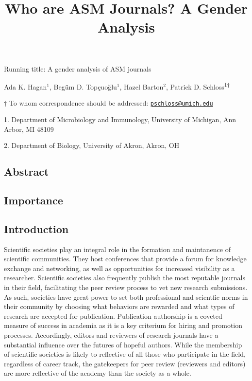 \documentclass[11pt,]{article}
\title{Who are ASM Journals? A Gender Analysis}
\author{}
\date{}
\begin{document}
\maketitle

\vspace{35mm}

Running title: A gender analysis of ASM journals

\vspace{35mm}

Ada K. Hagan\({^1}\), Begüm D. Topçuoğlu\({^1}\), Hazel Barton\({^2}\),
Patrick D. Schloss\textsuperscript{1\(\dagger\)}

\vspace{40mm}

\(\dagger\) To whom correspondence should be addressed:
\href{mailto:pschloss@umich.edu}{\nolinkurl{pschloss@umich.edu}}

1. Department of Microbiology and Immunology, University of Michigan,
Ann Arbor, MI 48109

2. Department of Biology, University of Akron, Akron, OH

\newpage

\linenumbers

\subsection{Abstract}\label{abstract}

\subsection{Importance}\label{importance}

\subsection{Introduction}\label{introduction}

Scientific societies play an integral role in the formation and
maintanence of scientific communities. They host conferences that
provide a forum for knowledge exchange and networking, as well as
opportunities for increased visibility as a researcher. Scientific
societies also frequently publish the most reputable journals in their
field, facilitating the peer review process to vet new research
submissions. As such, societies have great power to set both
professional and scientfic norms in their community by choosing what
behaviors are rewarded and what types of research are accepted for
publication. Publication authorship is a coveted measure of success in
academia as it is a key criterium for hiring and promotion processes.
Accordingly, editors and reviewers of research journals have a
substantial influence over the futures of hopeful authors. While the
membership of scientific societies is likely to reflective of all those
who participate in the field, regardless of career track, the
gatekeepers for peer review (reviewers and editors) are more reflective
of the academy than the society as a whole.
\end{document}
